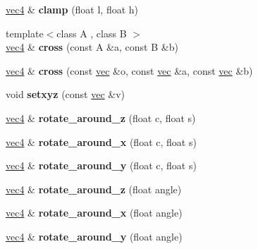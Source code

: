 \begin{DoxyCompactItemize}
\hyperlink{structvec4}{vec4} \& {\bfseries clamp} (float l, float h)
\item 
\mbox{\label{structvec4_aaee6f6d0902bbc40fc1cb5ea1f4ec587}} 
{\footnotesize template$<$class A , class B $>$ }\\\hyperlink{structvec4}{vec4} \& {\bfseries cross} (const A \&a, const B \&b)
\item 
\mbox{\label{structvec4_ab505c2f262a454d99ff795b22b756ac9}} 
\hyperlink{structvec4}{vec4} \& {\bfseries cross} (const \hyperlink{structvec}{vec} \&o, const \hyperlink{structvec}{vec} \&a, const \hyperlink{structvec}{vec} \&b)
\item 
\mbox{\label{structvec4_a9dcf0bb7cc44b2ffb28d34efe1c1f9dc}} 
void {\bfseries setxyz} (const \hyperlink{structvec}{vec} \&v)
\item 
\mbox{\label{structvec4_ad8c9eb00876650153aa34a0d6829f636}} 
\hyperlink{structvec4}{vec4} \& {\bfseries rotate\+\_\+around\+\_\+z} (float c, float s)
\item 
\mbox{\label{structvec4_a436b6551a6d164f4ece385a8baa48d41}} 
\hyperlink{structvec4}{vec4} \& {\bfseries rotate\+\_\+around\+\_\+x} (float c, float s)
\item 
\mbox{\label{structvec4_a2273f31ec8f30c7ef88d1441d11525b7}} 
\hyperlink{structvec4}{vec4} \& {\bfseries rotate\+\_\+around\+\_\+y} (float c, float s)
\item 
\mbox{\label{structvec4_a55dc8f5a2791df5b6e98e9e57307c2e1}} 
\hyperlink{structvec4}{vec4} \& {\bfseries rotate\+\_\+around\+\_\+z} (float angle)
\item 
\mbox{\label{structvec4_a50b5bc7cd925064847ae0f0358e5819a}} 
\hyperlink{structvec4}{vec4} \& {\bfseries rotate\+\_\+around\+\_\+x} (float angle)
\item 
\mbox{\label{structvec4_a121a4e44f82c37fa4f28c7406f939f28}} 
\hyperlink{structvec4}{vec4} \& {\bfseries rotate\+\_\+around\+\_\+y} (float angle)
\item 
\mbox{\label{structvec4_ac8e318ec8db20c228e23e6c906984b88}} 

\end{DoxyCompactItemize}

